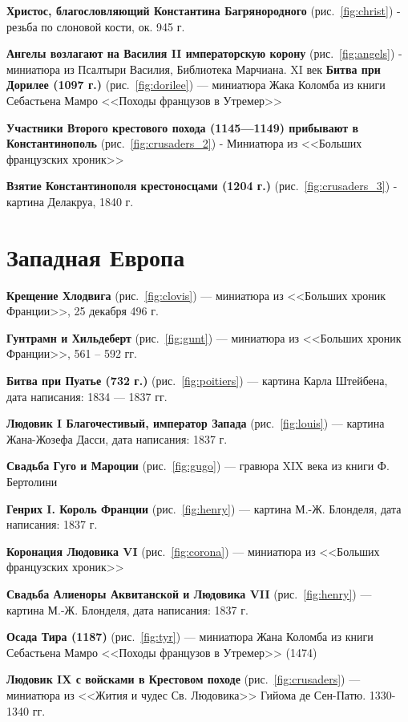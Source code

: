 \documentclass[a4paper,14pt]{article}
\begin{document}
\textbf{Христос, благословляющий Константина Багрянородного} (рис.~\ref{fig:christ})  -  резьба по слоновой кости, ок. 945 г.

\textbf{Ангелы возлагают на Василия II императорскую корону} (рис.~\ref{fig:angels}) - миниатюра из Псалтыри Василия, Библиотека Марчиана. XI век
\textbf{Битва при Дорилее (1097 г.)} (рис.~\ref{fig:dorilee}) --- миниатюра Жака Коломба из книги Себастьена Мамро <<Походы французов в Утремер>>

\textbf{Участники Второго крестового похода (1145—1149) прибывают в Константинополь} (рис.~\ref{fig:crusaders_2}) - Миниатюра из <<Больших французских хроник>> 

\textbf{Взятие Константинополя крестоносцами (1204 г.)} (рис.~\ref{fig:crusaders_3}) - картина Делакруа, 1840 г.

\section*{Западная Европа}
\textbf{Крещение Хлодвига} (рис.~\ref{fig:clovis}) --- миниатюра из <<Больших хроник Франции>>, 25 декабря 496 г.

\textbf{Гунтрамн и Хильдеберт} (рис.~\ref{fig:gunt}) --- миниатюра из <<Больших хроник Франции>>, 561 -- 592 гг.

\textbf{Битва при Пуатье (732 г.)} (рис.~\ref{fig:poitiers}) --- картина Карла Штейбена, дата написания: 1834 --- 1837 гг.


\textbf{Людовик I Благочестивый, император Запада} (рис.~\ref{fig:louis}) --- картина Жана-Жозефа Дасси, дата написания: 1837 г.

\textbf{Свадьба Гуго и Мароции} (рис.~\ref{fig:gugo}) ---  гравюра XIX века из книги Ф. Бертолини

\textbf{Генрих I. Король Франции} (рис.~\ref{fig:henry}) --- картина М.-Ж. Блонделя, дата написания: 1837 г.

\textbf{Коронация Людовика VI} (рис.~\ref{fig:corona}) --- миниатюра из <<Больших французских хроник>> 

\textbf{Свадьба Алиеноры Аквитанской и Людовика VII} (рис.~\ref{fig:henry}) --- картина М.-Ж. Блонделя, дата написания: 1837 г.

\textbf{Осада Тира (1187)} (рис.~\ref{fig:tyr}) --- миниатюра Жана Коломба из книги Себастьена Мамро <<Походы французов в Утремер>> (1474)

\textbf{Людовик IX с войсками в Крестовом походе} (рис.~\ref{fig:crusaders})  --- миниатюра из <<Жития и чудес Св. Людовика>> Гийома де Сен-Патю. 1330-1340 гг.




\end{document}
